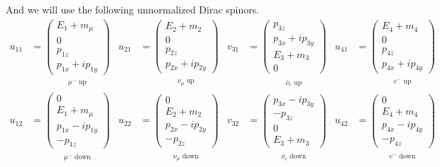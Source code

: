 \documentclass[12pt]{article}
\begin{document}
\noindent
And we will use the following unnormalized Dirac spinors.
\begin{align*}
u_{11}&=
\underset{\substack{\\[1ex]\text{$\mu^-$ up}}}
{\begin{pmatrix}E_1+m_\mu\\0\\p_{1z}\\p_{1x}+ip_{1y}\end{pmatrix}}
&
u_{21}&=
\underset{\substack{\\[1ex]\text{$\nu_\mu$ up}}}
{\begin{pmatrix}E_2+m_2\\0\\p_{2z}\\p_{2x}+ip_{2y}\end{pmatrix}}
&
v_{31}&=
\underset{\substack{\\[1ex]\text{$\bar{\nu}_e$ up}}}
{\begin{pmatrix}p_{3z}\\p_{3x}+ip_{3y}\\E_3+m_3\\0\end{pmatrix}}
&
u_{41}&=
\underset{\substack{\\[1ex]\text{$e^-$ up}}}
{\begin{pmatrix}E_4+m_4\\0\\p_{4z}\\p_{4x}+ip_{4y}\end{pmatrix}}
\\[2ex]
u_{12}&=
\underset{\substack{\\[1ex]\text{$\mu^-$ down}}}
{\begin{pmatrix}0\\E_1+m_\mu\\p_{1x}-ip_{1y}\\-p_{1z}\end{pmatrix}}
&
u_{22}&=
\underset{\substack{\\[1ex]\text{$\nu_\mu$ down}}}
{\begin{pmatrix}0\\E_2+m_2\\p_{2x}-ip_{2y}\\-p_{2z}\end{pmatrix}}
&
v_{32}&=
\underset{\substack{\\[1ex]\text{$\bar{\nu}_e$ down}}}
{\begin{pmatrix}p_{3x}-ip_{3y}\\-p_{3z}\\0\\E_3+m_3\end{pmatrix}}
&
u_{42}&=
\underset{\substack{\\[1ex]\text{$e^-$ down}}}
{\begin{pmatrix}0\\E_4+m_4\\p_{4x}-ip_{4y}\\-p_{4z}\end{pmatrix}}
\end{align*}
\end{document}
